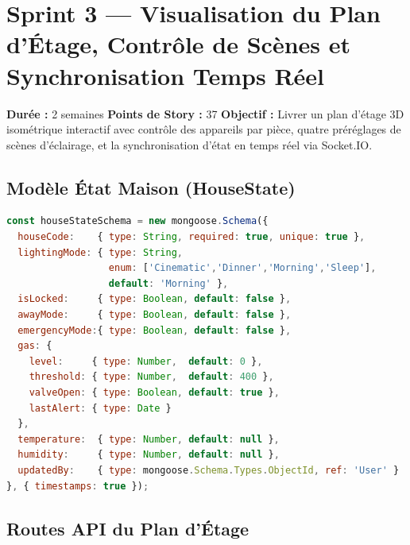 \chapter{Sprint 3 --- Visualisation du Plan d'Étage, Contrôle de Scènes et Synchronisation Temps Réel}

\begin{tcolorbox}[sprintbox,title={Sprint 3 --- Plan d'Étage et Synchronisation Temps Réel}]
\textbf{Durée :} 2 semaines \quad
\textbf{Points de Story :} 37 \quad
\textbf{Objectif :} Livrer un plan d'étage 3D isométrique interactif avec contrôle
des appareils par pièce, quatre préréglages de scènes d'éclairage, et la synchronisation
d'état en temps réel via Socket.IO.
\end{tcolorbox}

\section{Modèle État Maison (HouseState)}

\begin{lstlisting}[style=codeblock,language=JavaScript,caption={Sch\'ema HouseState (backend/models/HouseState.js)}]
const houseStateSchema = new mongoose.Schema({
  houseCode:    { type: String, required: true, unique: true },
  lightingMode: { type: String,
                  enum: ['Cinematic','Dinner','Morning','Sleep'],
                  default: 'Morning' },
  isLocked:     { type: Boolean, default: false },
  awayMode:     { type: Boolean, default: false },
  emergencyMode:{ type: Boolean, default: false },
  gas: {
    level:     { type: Number,  default: 0 },
    threshold: { type: Number,  default: 400 },
    valveOpen: { type: Boolean, default: true },
    lastAlert: { type: Date }
  },
  temperature:  { type: Number, default: null },
  humidity:     { type: Number, default: null },
  updatedBy:    { type: mongoose.Schema.Types.ObjectId, ref: 'User' }
}, { timestamps: true });
\end{lstlisting}

\section{Routes API du Plan d'Étage}

